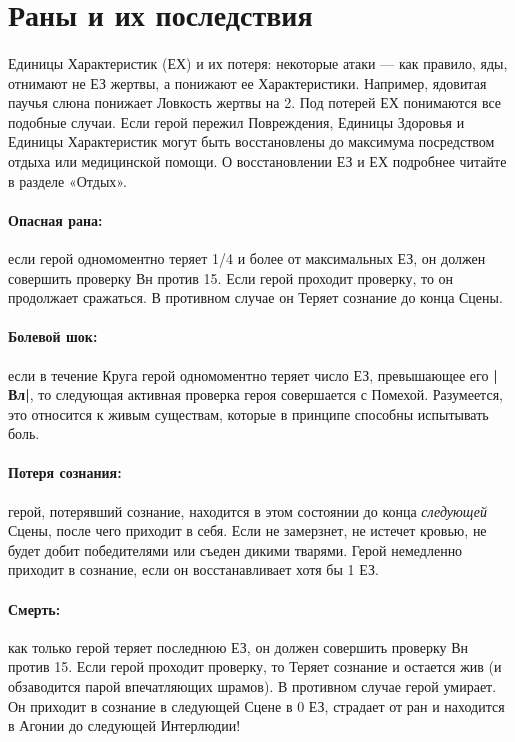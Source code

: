 \section{Раны и их последствия}
\paragraph{}
Единицы Характеристик (ЕХ) и их потеря: некоторые атаки — как правило, яды, отнимают не ЕЗ жертвы, а понижают ее Характеристики. Например, ядовитая паучья слюна понижает Ловкость жертвы на 2. Под потерей ЕХ понимаются все подобные случаи.
\newline
Если герой пережил Повреждения, Единицы Здоровья и Единицы Характеристик могут быть восстановлены до максимума посредством отдыха или медицинской помощи. О восстановлении ЕЗ и ЕХ подробнее читайте в разделе «Отдых».
\paragraph{Опасная рана:} если герой одномоментно теряет 1/4 и более от максимальных ЕЗ, он должен совершить проверку Вн против 15. Если герой проходит проверку, то он продолжает сражаться. В противном случае он Теряет сознание до конца Сцены.
\paragraph{Болевой шок:} если в течение Круга герой одномоментно теряет число ЕЗ, превышающее его \textbf{|Вл|}, то следующая активная проверка героя совершается с Помехой. Разумеется, это относится к живым существам, которые в принципе способны испытывать боль.
\paragraph{Потеря сознания:} герой, потерявший сознание, находится в этом состоянии до конца \textit{следующей} Сцены, после чего приходит в себя. Если не замерзнет, не истечет кровью, не будет добит победителями или съеден дикими тварями.
\newline
Герой немедленно приходит в сознание, если он восстанавливает хотя бы 1 ЕЗ.
\paragraph{Смерть:} как только герой теряет последнюю ЕЗ, он должен совершить проверку Вн против 15. Если герой проходит проверку, то Теряет сознание и остается жив (и обзаводится парой впечатляющих шрамов). В противном случае герой умирает. Он приходит в сознание в следующей Сцене в 0 ЕЗ, страдает от ран и находится в Агонии до следующей Интерлюдии!
